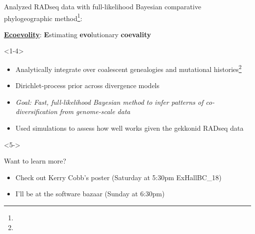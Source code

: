 % 
\begin{frame}[t]

    \vspace{0.04\textheight}
    Analyzed RADseq data with full-likelihood Bayesian comparative phylogeographic method\footnote{\tiny{}}:

    \begin{center}
        \LARGE
        \href{https://github.com/phyletica/ecoevolity}{
            \textbf{\textcolor{pgreen}{E}\textcolor{pteal}{co\textcolor{pauburn}{evo}lity}}}:
        \textcolor{pgreen}{\bf E}stimating \textcolor{pauburn}{\bf evo}lutionary \textcolor{pteal}{\bf coevality}
    \end{center}

    \begin{onlyenv}<1-4>
    \begin{itemize}
        \item<2-> Analytically integrate over coalescent genealogies and
            mutational histories\footnote{\tiny{}}
        \item<2-> Dirichlet-process prior across divergence models

        \bigskip
        \item<3-> \textsl{Goal: Fast, full-likelihood Bayesian method to infer
                patterns of co-diversification from genome-scale data}
        \item<4-> Used simulations to assess how well \ecoevolity works given
            the gekkonid RADseq data
    \end{itemize}
    \end{onlyenv}

    \begin{onlyenv}<5->
    \bigskip
    \begin{center}

    {\LARGE Want to learn more?}

    \bigskip
    \begin{itemize}
        \item<5-> Check out Kerry Cobb's poster (Saturday at 5:30pm ExHallBC\_18)
        \item<5-> I'll be at the software bazaar (Sunday at 6:30pm)
    \end{itemize}
    \end{center}
    \end{onlyenv}
\end{frame}

